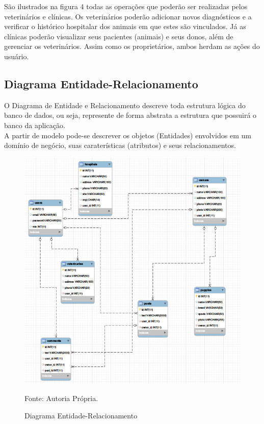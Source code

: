 São ilustrados na figura 4 todas as operações que poderão ser realizadas pelos veterinários e clínicas. Os veterinários poderão adicionar novos diagnósticos e a verificar o histórico hospitalar dos animais em que estes são vinculados. Já as clínicas poderão visualizar seus pacientes (animais) e seus donos, além de gerenciar os veterinários. Assim como os proprietários, ambos herdam as ações do usuário.

\subsection{Diagrama Entidade-Relacionamento}
O Diagrama de Entidade e Relacionamento descreve toda estrutura lógica do banco de dados,  ou seja, represente de forma abstrata a estrutura que possuirá o banco da aplicação.
\\
\indent
A partir de modelo pode-se descrever os objetos (Entidades) envolvidos em um domínio de negócio, suas caraterísticas (atributos) e seus relacionamentos.

\begin{figure}[h!]
	\centering	\includegraphics[scale=0.80
	]{imagens/entidaderelacionamento}
	\caption{Diagrama Entidade-Relacionamento}
	Fonte: Autoria Própria.
	\label{Rotulo}
\end{figure}

